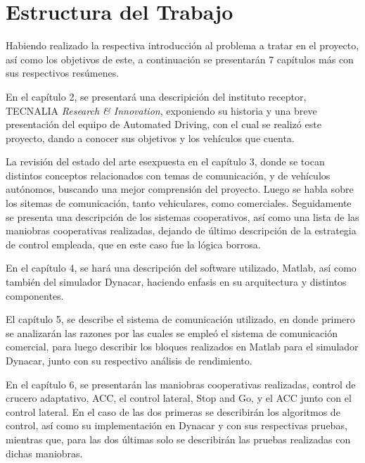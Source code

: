 \section{Estructura del Trabajo}

Habiendo realizado la respectiva introducción al problema a tratar en el proyecto, así como los objetivos de este, a continuación se presentarán 7 capítulos más con sus respectivos resúmenes.\\

\par En el capítulo 2, se presentará una descripición del instituto receptor, TECNALIA \textit{Research \& Innovation}, exponiendo su historia y una breve presentación del equipo de Automated Driving, con el cual se realizó este proyecto, dando a conocer sus objetivos y los vehículos que cuenta.\\

\par La revisión del estado del arte esexpuesta en el capítulo 3, donde se tocan distintos conceptos relacionados con temas de comunicación, y de vehículos autónomos, buscando una mejor comprensión del proyecto. Luego se habla sobre los sitemas de comunicación, tanto vehiculares, como comerciales. Seguidamente se presenta una descripción de los sistemas cooperativos, así como una lista de las maniobras cooperativas realizadas, dejando de  último descripción de la estrategia de control empleada, que en este caso fue la lógica borrosa.\\

\par En el capítulo 4, se hará una descripción del software utilizado, Matlab, así como también del simulador Dynacar, haciendo enfasis en su arquitectura y distintos componentes.\\

\par El capítulo 5, se describe el sistema de comunicación utilizado, en donde primero se analizarán las razones por las cuales se empleó el sistema de comunicación comercial, para luego describir los bloques realizados en Matlab para el simulador Dynacar, junto con su respectivo análisis de rendimiento.\\

\par En el capítulo 6, se presentarán las maniobras cooperativas realizadas, control de crucero adaptativo, ACC, el control lateral, Stop and Go, y el ACC junto con el control lateral. En el caso de las dos primeras se describirán los algoritmos de control, así como su implementación en Dynacar y con sus respectivas pruebas, mientras que, para las dos últimas solo se describirán las pruebas realizadas con dichas maniobras.\\

